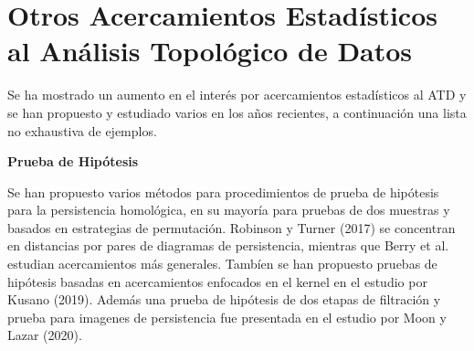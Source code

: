 \section{Otros Acercamientos Estad\'isticos al An\'alisis Topol\'ogico de Datos}

Se ha mostrado un aumento en el inter\'es por acercamientos estad\'isticos al ATD
y se han propuesto y estudiado varios en los a\~{n}os recientes, a continuaci\'on
una lista no exhaustiva de ejemplos.

\textbf{\large Prueba de Hip\'otesis}

Se han propuesto varios m\'etodos para procedimientos de prueba de hip\'otesis
para la persistencia homol\'ogica, en su mayor\'ia para pruebas de dos muestras y
basados en estrategias de permutaci\'on.
Robinson y Turner (2017)\cite{Robinson2017} se concentran en distancias por pares
de diagramas de persistencia, mientras que Berry et al. \cite{Berry2020}
estudian acercamientos m\'as generales.
Tamb\'ien se han propuesto pruebas de hip\'otesis basadas en
acercamientos enfocados en el kernel en el estudio por Kusano (2019)\cite{Kusano2019}.
Adem\'as una prueba de hip\'otesis de dos etapas de filtraci\'on y prueba para imagenes de
persistencia fue presentada en el estudio por Moon y Lazar (2020)\cite{Moon2020}.

